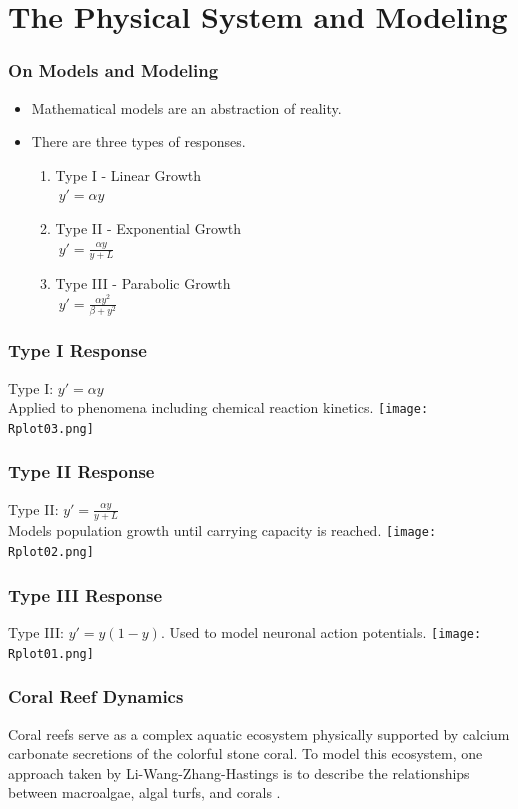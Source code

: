 
\section{The Physical System and Modeling}
\begin{frame}\frametitle{On Models and Modeling}
  \begin{itemize}
	\item Mathematical models are an abstraction of reality.
	\item There are three types of responses. 
	\begin{enumerate}
		\item Type I - Linear Growth\\
		$\ y'=\alpha y$
		\item Type II - Exponential Growth\\
		$\ y' = \frac{\alpha y}{y+ L}$ 
		\item Type III - Parabolic Growth\\
		$\ y'= \frac {\alpha y^2}{\beta + y^2}$
	\end{enumerate}
  \end{itemize}
\end{frame}

\begin{frame}
  \frametitle{Type I Response}
   Type I: $y'=\alpha y$\\ Applied to phenomena including chemical reaction kinetics.
   \texttt{[image: Rplot03.png]}
\end{frame}

\begin{frame}
  \frametitle{Type II Response} 
    Type II: $y'=\frac{\alpha y}{y+L}$\\Models population growth until carrying capacity is reached.
   \texttt{[image: Rplot02.png]}
\end{frame}

\begin{frame}
  \frametitle{Type III Response}
    Type III: $y'=y(1-y)$. Used to model neuronal action potentials.
    \texttt{[image: Rplot01.png]}
\end{frame}

\begin{frame}
\frametitle{Coral Reef Dynamics}
\hspace{1.5em}Coral reefs serve as a complex aquatic ecosystem physically supported by calcium carbonate secretions of the colorful stone coral. To model this ecosystem, one approach taken by Li-Wang-Zhang-Hastings is to describe the relationships between macroalgae, algal turfs, and corals \cite{Hastings}.
\end{frame}

